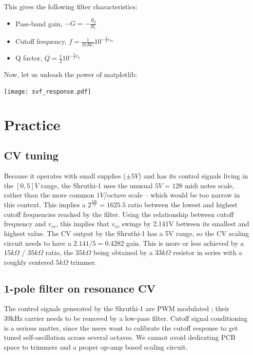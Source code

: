 \documentclass[a4paper,11pt]{article}
\begin{document}
This gives the following filter characteristics:

\begin{itemize}
\item Pass-band gain, $-G = -\frac{R_g}{R_i}$
\item Cutoff frequency, $f = \frac{1}{2 \pi R C} 10 ^ {-\frac{3}{2} v_{cv}}$
\item Q factor, $Q = \frac{1}{2} 10^{-\frac{3}{2} v_{q}} $

\end{itemize}

Now, let us unleash the power of matplotlib:

\begin{center}
\texttt{[image: svf\_response.pdf]}
\end{center}

\section{Practice}

\subsection{CV tuning}

Because it operates with small supplies ($\pm 5V$) and has its control signals living in the $[0, 5]V$ range, the Shruthi-1 uses the unusual $5V$ = $128$ midi notes scale, rather than the more common $1V$/octave scale -- which would be too narrow in this context. This implies a $2^{\frac{128}{12}} = 1625.5$ ratio between the lowest and highest cutoff frequencies reached by the filter. Using the relationship between cutoff frequency and $v_{cv}$, this implies that $v_{cv}$ swings by 2.141V between its smallest and highest value. The CV output by the Shruthi-1 has a 5V range, so the CV scaling circuit needs to have a $2.141 / 5 = 0.4282$ gain. This is more or less achieved by a $15k\Omega$ / $35k\Omega$ ratio, the $35k\Omega$ being obtained by a $33k\Omega$ resistor in series with a roughly centered $5k\Omega$ trimmer.

\subsection{1-pole filter on resonance CV}

The control signals generated by the Shruthi-1 are PWM modulated ; their 39kHz carrier needs to be removed by a low-pass filter. Cutoff signal conditioning is a serious matter, since the users want to calibrate the cutoff response to get tuned self-oscillation across several octaves. We cannot avoid dedicating PCB space to trimmers and a proper op-amp based scaling circuit.
\end{document}
